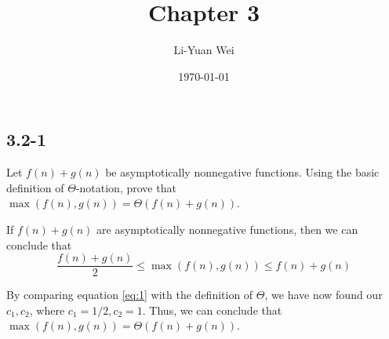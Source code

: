 \documentclass[a4paper]{article}
\makeatletter
\renewenvironment{proof}[1][\proofname]{%
  \par\pushQED{\qed}\normalfont%
  \topsep6\p@\@plus6\p@\relax
  \trivlist\item[\hskip\labelsep\bfseries#1\@addpunct{.}]%
  \ignorespaces
}{%
  \popQED\endtrivlist\@endpefalse
}
\makeatother
\begin{document}
\title{Chapter 3}
\author{Li-Yuan Wei}
\date{\today}
\maketitle

\subsection*{3.2-1}
Let $f(n) + g(n)$ be asymptotically nonnegative functions. Using the basic definition of $\Theta$-notation, prove that $\max(f(n), g(n)) = \Theta(f(n) + g(n))$.

\begin{proof}
  If $f(n) + g(n)$ are asymptotically nonnegative functions, then we can conclude that
  \begin{equation}
    \frac{f(n) + g(n)}{2} \le \max(f(n), g(n)) \le f(n) + g(n) \label{eq:1}
  \end{equation}

  By comparing equation \ref{eq:1} with the definition of $\Theta$, we have now found our $c_1, c_2$, where $c_1 = 1/2, c_2 = 1$. Thus, we can conclude that $\max(f(n), g(n)) = \Theta(f(n) + g(n))$.
\end{proof}
\end{document}
